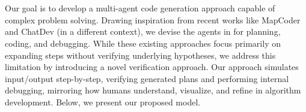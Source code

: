 
\section{\tool}
\label{sec:mapcoder}
\label{sec:codesim}

Our goal is to develop a multi-agent code generation approach capable of complex problem solving. Drawing inspiration from recent works like MapCoder and ChatDev (in a different context), we devise the agents in \tool for planning, coding, and debugging. 
While these existing approaches focus primarily on expanding steps without verifying underlying hypotheses, we address this limitation by introducing a novel verification approach. Our approach simulates input/output step-by-step, verifying generated plans and performing internal debugging, mirroring how humans understand, visualize, and refine in algorithm development. Below, we present our proposed model.







